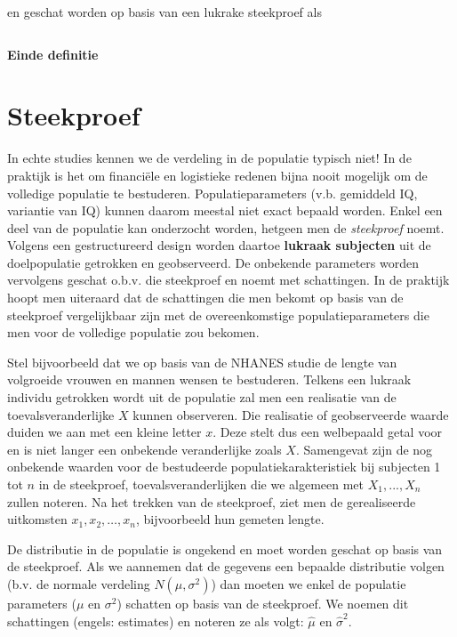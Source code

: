 \documentclass[
  12pt,dutch,coursenotes]{book}
\theoremstyle{definition}
\theoremstyle{definition}
\theoremstyle{definition}
\theoremstyle{remark}
\begin{document}
\begin{equation*}
[\mu-z_{\alpha/2}\sigma,\mu+z_{\alpha/2}\sigma]
\end{equation*}

en geschat worden op basis van een lukrake steekproef als

\begin{equation*}
[\bar x-z_{\alpha/2}s_x,\bar x+z_{\alpha/2}s_x]
\end{equation*}

\textbf{Einde definitie}

\hypertarget{steekproef}{%
\section{Steekproef}\label{steekproef}}

In echte studies kennen we de verdeling in de populatie typisch niet!
In de praktijk is het om financiële en logistieke redenen bijna nooit mogelijk om de
volledige populatie te bestuderen. Populatieparameters (v.b. gemiddeld IQ, variantie van IQ) kunnen daarom meestal
niet exact bepaald worden. Enkel een deel van de populatie kan onderzocht
worden, hetgeen men de \emph{steekproef} noemt. Volgens een
gestructureerd design worden daartoe \textbf{lukraak subjecten} uit de doelpopulatie
getrokken en geobserveerd. De onbekende parameters worden vervolgens geschat
o.b.v. die steekproef en noemt met schattingen. In de praktijk hoopt men uiteraard dat de schattingen die men bekomt op basis van de steekproef vergelijkbaar zijn met de overeenkomstige populatieparameters die men voor de volledige populatie zou bekomen.

Stel bijvoorbeeld dat we op basis van de NHANES studie de lengte van volgroeide vrouwen en mannen wensen te bestuderen.
Telkens een lukraak individu getrokken wordt uit de populatie zal men een
realisatie van de toevalsveranderlijke \(X\) kunnen observeren. Die realisatie
of geobserveerde waarde duiden we aan met een kleine letter \(x\). Deze stelt
dus een welbepaald getal voor en is niet langer een onbekende veranderlijke
zoals \(X\). Samengevat zijn de nog onbekende waarden voor de
bestudeerde populatiekarakteristiek bij subjecten 1 tot \(n\) in de
steekproef, toevalsveranderlijken die we algemeen met \(X_1,...,X_n\)
zullen noteren. Na het trekken van de steekproef, ziet men de gerealiseerde
uitkomsten \(x_1, x_2, \dots, x_n\), bijvoorbeeld hun gemeten lengte.

De distributie in de populatie is ongekend en moet worden geschat op basis van de steekproef. Als we aannemen dat de gegevens een bepaalde distributie volgen (b.v. de normale verdeling \(N(\mu,\sigma^2)\)) dan moeten we enkel de populatie parameters (\(\mu\) en \(\sigma^2\)) schatten op basis van de steekproef. We noemen dit schattingen (engels: estimates) en noteren ze als volgt: \(\hat \mu\) en \(\hat \sigma^2\).
\end{document}
